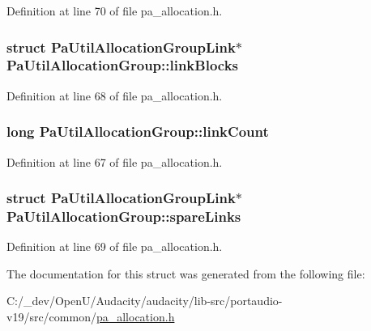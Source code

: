 Definition at line 70 of file pa\+\_\+allocation.\+h.

\subsubsection[{\texorpdfstring{link\+Blocks}{linkBlocks}}]{\setlength{\rightskip}{0pt plus 5cm}struct {\bf Pa\+Util\+Allocation\+Group\+Link}$\ast$ Pa\+Util\+Allocation\+Group\+::link\+Blocks}\hypertarget{struct_pa_util_allocation_group_a13cc36a8a6859cdcbb9bda370cc34f6f}{}\label{struct_pa_util_allocation_group_a13cc36a8a6859cdcbb9bda370cc34f6f}


Definition at line 68 of file pa\+\_\+allocation.\+h.

\subsubsection[{\texorpdfstring{link\+Count}{linkCount}}]{\setlength{\rightskip}{0pt plus 5cm}long Pa\+Util\+Allocation\+Group\+::link\+Count}\hypertarget{struct_pa_util_allocation_group_adf2cd1d334a9703bf6aa35298bafb3cd}{}\label{struct_pa_util_allocation_group_adf2cd1d334a9703bf6aa35298bafb3cd}


Definition at line 67 of file pa\+\_\+allocation.\+h.

\subsubsection[{\texorpdfstring{spare\+Links}{spareLinks}}]{\setlength{\rightskip}{0pt plus 5cm}struct {\bf Pa\+Util\+Allocation\+Group\+Link}$\ast$ Pa\+Util\+Allocation\+Group\+::spare\+Links}\hypertarget{struct_pa_util_allocation_group_ae83b87241f68c69e41df760cd8324d58}{}\label{struct_pa_util_allocation_group_ae83b87241f68c69e41df760cd8324d58}


Definition at line 69 of file pa\+\_\+allocation.\+h.



The documentation for this struct was generated from the following file\+:\begin{DoxyCompactItemize}
\item 
C\+:/\+\_\+dev/\+Open\+U/\+Audacity/audacity/lib-\/src/portaudio-\/v19/src/common/\hyperlink{pa__allocation_8h}{pa\+\_\+allocation.\+h}\end{DoxyCompactItemize}
